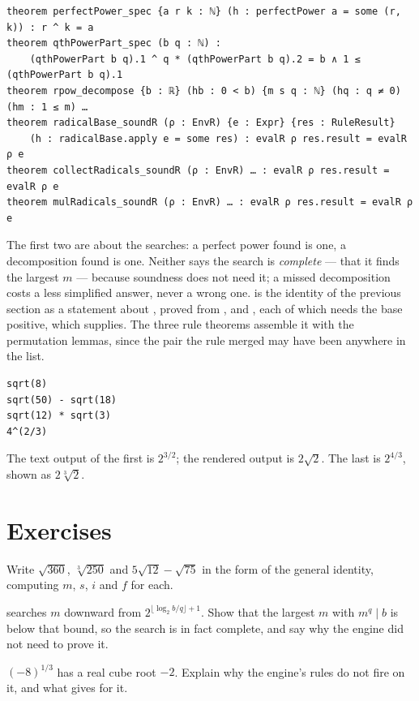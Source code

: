 \begin{verbatim}
theorem perfectPower_spec {a r k : ℕ} (h : perfectPower a = some (r, k)) : r ^ k = a
theorem qthPowerPart_spec (b q : ℕ) :
    (qthPowerPart b q).1 ^ q * (qthPowerPart b q).2 = b ∧ 1 ≤ (qthPowerPart b q).1
theorem rpow_decompose {b : ℝ} (hb : 0 < b) {m s q : ℕ} (hq : q ≠ 0) (hm : 1 ≤ m) …
theorem radicalBase_soundR (ρ : EnvR) {e : Expr} {res : RuleResult}
    (h : radicalBase.apply e = some res) : evalR ρ res.result = evalR ρ e
theorem collectRadicals_soundR (ρ : EnvR) … : evalR ρ res.result = evalR ρ e
theorem mulRadicals_soundR (ρ : EnvR) … : evalR ρ res.result = evalR ρ e
\end{verbatim}

The first two are about the searches: a perfect power found is one, a decomposition found is one.
Neither says the search is \emph{complete} --- that it finds the largest $m$ --- because
soundness does not need it; a missed decomposition costs a less simplified answer, never a wrong
one.  is the identity of the previous section as a statement about
, proved from ,  and ,
each of which needs the base positive, which  supplies. The three rule
theorems assemble it with the permutation lemmas, since the pair the rule merged may have been
anywhere in the list.

\begin{trybox}
\begin{verbatim}
sqrt(8)
sqrt(50) - sqrt(18)
sqrt(12) * sqrt(3)
4^(2/3)
\end{verbatim}
  The text output of the first is $2^{3/2}$; the rendered output is $2\sqrt 2$. The last is
  $2^{4/3}$, shown as $2\sqrt[3]{2}$.
\end{trybox}

\section{Exercises}

\begin{exercisebox}[By hand]
  Write $\sqrt{360}$, $\sqrt[3]{250}$ and $5\sqrt{12} - \sqrt{75}$ in the form of the general
  identity, computing $m$, $s$, $i$ and $f$ for each.
\end{exercisebox}

\begin{exercisebox}[Completeness]
   searches $m$ downward from $2^{\lfloor \log_2 b / q \rfloor + 1}$. Show that
  the largest $m$ with $m^q \mid b$ is below that bound, so the search is in fact complete, and
  say why the engine did not need to prove it.
\end{exercisebox}

\begin{exercisebox}
  $(-8)^{1/3}$ has a real cube root $-2$. Explain why the engine's rules do not fire on it, and
  what  gives for it.
\end{exercisebox}
